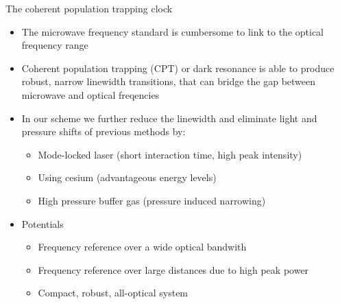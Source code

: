 \begin{block}{The coherent population trapping clock}
  \begin{itemize}
  \item The microwave frequency standard is cumbersome to link to the optical frequency range
  \item Coherent population trapping (CPT) or dark resonance is able to produce robust, narrow linewidth transitions, that can bridge the gap between microwave and optical freqencies
  \item In our scheme we further reduce the linewidth and eliminate light and pressure shifts of previous methods by:
    \begin{itemize}
    \item Mode-locked laser (short interaction time, high peak intensity)
    \item Using cesium (advantageous energy levels)
    \item High pressure buffer gas (pressure induced narrowing)
    \end{itemize}
  \item Potentials
    \begin{itemize}
    \item Frequency reference over a wide optical bandwith
    \item Frequency reference over large distances due to high peak power
    \item Compact, robust, all-optical system
    \end{itemize}
  \end{itemize}
\end{block}
